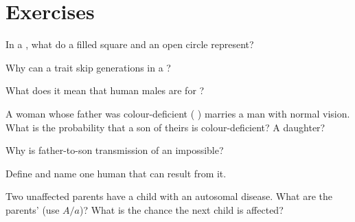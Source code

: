 \section{Exercises}

\begin{exercise}[$\star$]\label{exo:g11:human-genetics:1}
In a , what do a filled square and an open circle represent?
\end{exercise}

\begin{exercise}[$\star$]\label{exo:g11:human-genetics:2}
Why can a  trait skip generations in a ?
\end{exercise}

\begin{exercise}[$\star$]\label{exo:g11:human-genetics:3}
What does it mean that human males are  for  ?
\end{exercise}

\begin{exercise}[$\star\star$]\label{exo:g11:human-genetics:4}
A woman whose father was colour-deficient ( ) marries a man
with normal vision. What is the probability that a son of theirs is
colour-deficient? A daughter?
\end{exercise}

\begin{exercise}[$\star\star$]\label{exo:g11:human-genetics:5}
Why is father-to-son transmission of an   impossible?
\end{exercise}

\begin{exercise}[$\star\star$]\label{exo:g11:human-genetics:6}
Define  and name one human  that can result from it.
\end{exercise}

\begin{exercise}[$\star\star$]\label{exo:g11:human-genetics:7}
Two unaffected parents have a child with an autosomal  disease. What
are the parents'  (use $A/a$)? What is the chance the next child is
affected?
\end{exercise}

